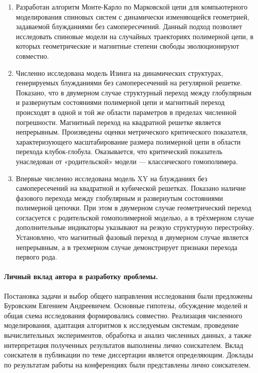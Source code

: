 \begin{enumerate}
	\item  Разработан алгоритм Монте-Карло по Марковской цепи для компьютерного  моделирования спиновых систем с динамически изменяющейся геометрией, задаваемой блужданиями без самопересечений. 
	Данный подход позволяет исследовать спиновые модели на случайных траекториях полимерной цепи, в которых геометрические и магнитные степени свободы эволюционируют совместно.
	
	
	\item Численно исследована модель Изинга на динамических структурах, генерируемых блужданиями без самопересечений на регулярной решетке.  Показано, что в двумерном случае структурный переход между глобулярным и развернутым состояниями полимерной цепи и магнитный переход происходят в одной и той же области параметров в пределах численной погрешности. 
	Магнитный переход на квадратной решетке является непрерывным. 
	Произведены оценки метрического критического показателя, характеризующего масштабирование размера полимерной цепи в области перехода клубок-глобула. 
	Оказывается, что критический показатель унаследован от «родительской» модели --- классического гомополимера. 
	
 
	
	\item Впервые численно исследована модель XY на блужданиях без самопересечений на квадратной и кубической решетках. 
	Показано наличие фазового перехода между глобулярным и развернутым состояниями полимерной цепочки. При этом в двумерном случае геометрический переход согласуется с родительской гомополимерной моделью, а в трёхмерном случае дополнительные индикаторы указывают на резкую структурную перестройку.
	Установлено, что магнитный фазовый переход в двумерном случае является непрерывным, а в трехмерном случае демонстрирует признаки перехода первого рода.
 
\end{enumerate} 

 
\paragraph*{Личный вклад автора в разработку проблемы.}

Постановка задачи и выбор общего направления исследования были предложены Буровским Евгением Андреевичем. 
Основные гипотезы, обсуждение моделей и общая схема исследования формировались совместно.
Реализация численного моделирования, адаптация алгоритмов к исследуемым системам, проведение вычислительных экспериментов, обработка и анализ численных данных, а также интерпретация полученных результатов выполнены лично соискателем. 
 Вклад соискателя в публикации по теме диссертации является определяющим. Доклады по результатам работы на конференциях были представлены лично соискателем.

